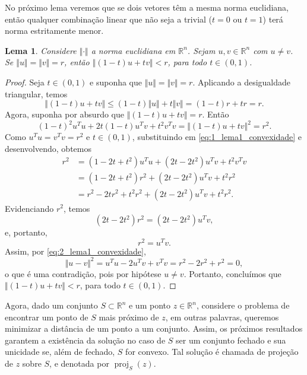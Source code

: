 \documentclass[12pt,a4paper]{scrartcl}
\DeclareMathOperator{\proj}{proj}
\def\RR{\mathds{R}}
\newtheorem{lema}{Lema}
\theoremstyle{definition}%
\begin{document}
No próximo lema veremos que se dois vetores têm a mesma norma euclidiana, então qualquer combinação linear que não seja a trivial ($t=0$ ou $t=1$) terá norma estritamente menor.

\begin{lema} \label{lema:1_convexidade}
Considere $\Vert \cdot \Vert$ a norma euclidiana em $\RR^{n}$. Sejam $u,v \in \RR^{n}$ com $u\neq v$. Se $\Vert u \Vert = \Vert v \Vert = r$, então $\Vert (1-t)u + tv \Vert < r$, para todo $t \in (0,1)$.
\end{lema}

\begin{proof}
Seja $t \in (0,1)$ e suponha que $\Vert u \Vert = \Vert v \Vert = r$. Aplicando a desigualdade triangular, temos
\[
\Vert (1-t)u + tv \Vert \leq (1-t)\Vert u \Vert + t\Vert v \Vert = (1-t)r + tr = r.
\]
Agora, suponha por absurdo que $\Vert (1-t)u + tv \Vert = r$. Então
\[ \label{eq:1_lema1_convexidade}
(1-t)^{2} u^{T}u + 2t(1-t)u^{T}v + t^{2}v^{T}v = \Vert (1-t)u + tv \Vert^{2} = r^{2}.
\]
Como $u^{T}u = v^{T}v = r^{2}$ e $t \in (0,1)$, substituindo em \eqref{eq:1_lema1_convexidade} e desenvolvendo, obtemos 
\begin{align}
r^{2} &= (1-2t+t^{2}) u^{T}u + (2t-2t^{2})u^{T}v + t^{2}v^{T}v \\
&= (1-2t+t^{2}) r^{2} + (2t-2t^{2})u^{T}v + t^{2}r^{2} \\
&= r^{2} - 2tr^{2} + t^{2}r^{2} + (2t-2t^{2})u^{T}v + t^{2}r^{2} .
\end{align}
Evidenciando $r^{2}$, temos
\[ 
(2t-2t^{2})r^{2} = (2t-2t^{2})u^{T}v,
\]
e, portanto,
\[ \label{eq:2_lema1_convexidade}
r^{2} = u^{T}v.
\]
Assim, por \eqref{eq:2_lema1_convexidade},
\[
\Vert u-v \Vert^{2} = u^{T}u - 2u^{T}v + v^{T}v = r^{2} - 2r^{2} + r^{2} = 0,
\]
o que é uma contradição, pois por hipótese $u \neq v$. 
Portanto, concluímos que $\Vert (1-t)u + tv \Vert < r$, para todo $t \in (0,1)$.
\end{proof}

Agora, dado um conjunto $S \subset \RR^{n}$ e um ponto $z \in \RR^{n}$, considere o problema de encontrar um ponto de $S$ mais próximo de $z$, em outras palavras, queremos minimizar a distância de um ponto a um conjunto. Assim, os próximos resultados garantem a existência da solução no caso de $S$ ser um conjunto fechado e sua unicidade se, além de fechado, $S$ for convexo. Tal solução é chamada de projeção de $z$ sobre $S$, e denotada por $\proj_{S} (z)$. 
\end{document}
